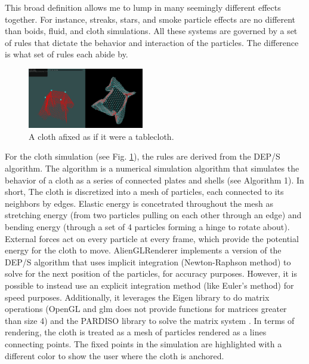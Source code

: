 \documentclass[letterpaper, 10 pt, conference]{ieeeconf}  %
\begin{document}
This broad definition allows me to lump in many seemingly different effects together. For instance, streaks, stars, and smoke particle effects are no different than boids\cite{reynolds1987flocks}, fluid\cite{stam1999stable}, and cloth simulations. All these systems are governed by a set of rules that dictate the behavior and interaction of the particles. The difference is what set of rules each abide by. 

\begin{figure}
        \centering
        \includegraphics[width=0.45\textwidth]{cool1.PNG}
        \caption{A cloth afixed as if it were a tablecloth.} \label{fig:cloth}
\end{figure}


For the cloth simulation (see Fig. \ref{fig:cloth}), the rules are derived from the DEP/S algorithm. The algorithm is a numerical simulation algorithm that simulates the behavior of a cloth as a series of connected plates and shells (see Algorithm 1). In short, The cloth is discretized into a mesh of particles, each connected to its neighbors by edges. Elastic energy is concetrated throughout the mesh as stretching energy (from two particles pulling on each other through an edge) and bending energy (through a set of 4 particles forming a hinge to rotate about). External forces act on every particle at every frame, which provide the potential energy for the cloth to move. AlienGLRenderer implements a version of the DEP/S algorithm that uses implicit integration (Newton-Raphson method) to solve for the next position of the particles, for accuracy purposes. However, it is possible to instead use an explicit integration method (like Euler's method) for speed purposes. Additionally, it leverages the Eigen library \cite{eigen_library} to do matrix operations (OpenGL and glm does not provide functions for matrices greater than size 4) and the PARDISO library to solve the matrix system \cite{Pasadakis2023} \cite{EFTEKHARI2021101389} \cite{gaedkemerzhäuser2022}. In terms of rendering, the cloth is treated as a mesh of particles rendered as a lines connecting points. The fixed points in the simulation are highlighted with a different color to show the user where the cloth is anchored.
\end{document}
